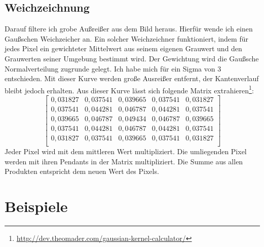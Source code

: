 \subsection{Weichzeichnung}
Darauf filtere ich grobe Außreißer aus dem Bild heraus. Hierfür wende ich einen Gaußschen Weichzeicher an. Ein solcher Weichzeichner funktioniert, indem für jedes Pixel ein gewichteter Mittelwert aus seinem eigenen Grauwert und den Grauwerten seiner Umgebung bestimmt wird. Der Gewichtung wird die Gaußsche Normalverteilung zugrunde gelegt. Ich habe mich für ein Sigma von 3 entschieden. Mit dieser Kurve werden große Ausreißer entfernt, der Kantenverlauf bleibt jedoch erhalten. Aus dieser Kurve lässt sich folgende Matrix extrahieren\footnote{\url{http://dev.theomader.com/gaussian-kernel-calculator/}}:
\begin{equation}
	\begin{bmatrix}
	0,031827&0,037541&0,039665&0,037541&0,031827 \\
	0,037541&0,044281&0,046787&0,044281&0,037541 \\
	0,039665&0,046787&0,049434&0,046787&0,039665 \\
	0,037541&0,044281&0,046787&0,044281&0,037541 \\
	0,031827&0,037541&0,039665&0,037541&0,031827 \\
	\end{bmatrix}
\end{equation}
Jeder Pixel wird mit dem mittleren Wert multipliziert. Die umliegenden Pixel werden mit ihren Pendants in der Matrix multipliziert. Die Summe aus allen Produkten entspricht dem neuen Wert des Pixels.
\section{Beispiele}
